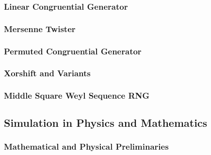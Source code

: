 \documentclass{stdlocal}
\begin{document}
    \subsubsection*{Linear Congruential Generator} %
    \label{ssub:linear_congruential_generator}


    \subsubsection*{Mersenne Twister} %
    \label{ssub:mersenne_twister}


    \subsubsection*{Permuted Congruential Generator} %
    \label{ssub:permuted_congruential_generator}


    \subsubsection*{Xorshift and Variants} %
    \label{ssub:xorshift_and_variants}


    \subsubsection*{Middle Square Weyl Sequence RNG} %
    \label{ssub:middle_square_weyl_sequence_rng}


  \subsection{Simulation in Physics and Mathematics} %
  \label{sub:simulation_in_physics_and_mathematics}
    \subsubsection*{Mathematical and Physical Preliminaries} %
    \label{ssub:mathematical_and_physical_preliminaries}
\end{document}
